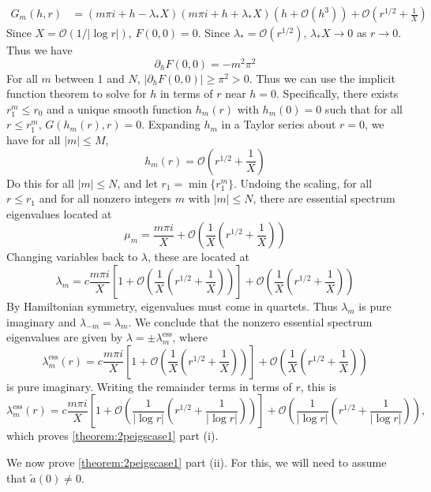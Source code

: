\documentclass[thesis.tex]{subfiles}
\begin{document}
\begin{equation}\label{Bess4}
\begin{aligned}
G_m(h, r) &= (m \pi i + h - \lambda_* X)(m \pi i + h + \lambda_* X) \left( h + \mathcal{O}(h^3) \right) + \mathcal{O}\left( r^{1/2} + \frac{1}{X} \right)
\end{aligned}
\end{equation}
Since $X = \mathcal{O}(1/|\log r|)$, $F(0,0) = 0$. Since $\lambda_* = \mathcal{O}(r^{1/2})$, $\lambda_* X \rightarrow 0$ as $r \rightarrow 0$. Thus we have
\[
\partial_h F(0,0) = -m^2 \pi^2
\]
For all $m$ between 1 and $N$, $|\partial_h F(0,0)| \geq \pi^2 > 0$. Thus we can use the implicit function theorem to solve for $h$ in terms of $r$ near $h = 0$. Specifically, there exists $r_1^m \leq r_0$ and a unique smooth function $h_m(r)$ with $h_m(0) = 0$ such that for all $r \leq r_1^m$, $G(h_m(r),r) = 0$. Expanding $h_m$ in a Taylor series about $r = 0$, we have for all $|m| \leq M$,
\[
h_m(r) = \mathcal{O}\left( r^{1/2} + \frac{1}{X} \right)
\]
Do this for all $|m| \leq N$, and let $r_1 = \min\{ r_1^m \}$. Undoing the scaling, for all $r \leq r_1$ and for all nonzero integers $m$ with $|m| \leq N$, there are essential spectrum eigenvalues located at
\[
\mu_m = \frac{m \pi i}{X} + \mathcal{O}\left( \frac{1}{X}\left( r^{1/2} + \frac{1}{X} \right) \right)
\]
Changing variables back to $\lambda$, these are located at
\[
\lambda_m = c \frac{m \pi i}{X}\left[1 + \mathcal{O}\left( \frac{1}{X}\left( r^{1/2} + \frac{1}{X} \right) \right) \right] + \mathcal{O}\left( \frac{1}{X}\left( r^{1/2} + \frac{1}{X} \right) \right)
\]
By Hamiltonian symmetry, eigenvalues must come in quartets. Thus $\lambda_m$ is pure imaginary and $\lambda_{-m} = \lambda_m$. We conclude that the nonzero essential spectrum eigenvalues are given by $\lambda = \pm \lambda_m^{\text{ess}}$, where
\[
\lambda_m^{\text{ess}}(r) = c \frac{m \pi i}{X}\left[1 + \mathcal{O}\left( \frac{1}{X}\left( r^{1/2} + \frac{1}{X} \right) \right) \right] + \mathcal{O}\left( \frac{1}{X}\left( r^{1/2} + \frac{1}{X} \right) \right)
\]
is pure imaginary. Writing the remainder terms in terms of $r$, this is
\[
\lambda_m^{\text{ess}}(r) = c \frac{m \pi i}{X}\left[1 + \mathcal{O}\left( \frac{1}{|\log r|}\left( r^{1/2} + \frac{1}{|\log r|} \right) \right) \right] + \mathcal{O}\left( \frac{1}{|\log r|}\left( r^{1/2} + \frac{1}{|\log r|} \right) \right),
\]
which proves \cref{theorem:2peigscase1} part (i).

We now prove \cref{theorem:2peigscase1} part (ii). For this, we will need to assume that $\tilde{a}(0) \neq 0$.
\end{document}
